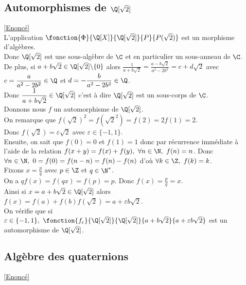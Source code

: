 \documentclass[8pt]{book}
\begin{document}
	\subsection{Automorphismes de $\Q[\sqrt 2]$ }
	\label{Automorphismes de Qsqrt2 corrigé}
	\textcolor{blue}{\hyperref[Automorphismes de Qsqrt2]{[Enoncé]}}\\
	L'application $\fonction{\Phi}{\Q[X]}{\Q[\sqrt2]}{P}{P(\sqrt 2)}$ est un morphisme d'algèbres.\\
	Donc $\Q[\sqrt 2]$ est une sous-algèbre de $\C$ et en particulier un sous-anneau de $\C$.\\
	De plus, si $a+b\sqrt 2\in \Q[\sqrt 2]\backslash\{0\}$ alors $\displaystyle\frac{1}{a+b\sqrt 2}=\frac{a-b\sqrt 2}{a^2-2b^2}=c+d\sqrt 2$ avec $c=\displaystyle\frac{a}{a^2-2b^2}\in \Q$ et $d=-\displaystyle\frac{b}{a^2-2b^2}\in \Q$.\\
	Donc $\displaystyle\frac{1}{a+b\sqrt 2}\in \Q[\sqrt 2]$ c'est à dire $\Q[\sqrt 2]$ est un sous-corps de $\C$.\\
	Donnons nous $f$ un automorphisme de $\Q[\sqrt 2]$.\\
	On remarque que $f(\sqrt 2)^2=f({\sqrt 2}^2)=f(2)=2f(1)=2$.\\
	Donc $f(\sqrt 2)=\varepsilon\sqrt 2$ avec $\varepsilon\in \{-1,1\}$.\\
	Ensuite, on sait que $f(0)=0$ et $f(1)=1$ donc par récurrence immédiate à l'aide de la relation $f(x+y)=f(x)+f(y),\ \forall n\in \N,\ f(n)=n$. Donc $\forall n\in \N,\ 0=f(0)=f(n-n)=f(n)-f(n)$ d'où $\forall k\in \Z,\ f(k)=k$.\\
	Fixons $x=\displaystyle\frac{p}{q}$ avec $p\in \Z$ et $q\in \N^*$.\\
	On a $qf(x)=f(qx)=f(p)=p$. Donc $f(x)=\displaystyle\frac{p}{q}=x$.\\
	Ainsi si $x=a+b\sqrt 2\in \Q[\sqrt 2]$ alors $f(x)=f(a)+f(b)f(\sqrt 2)=a+\varepsilon b\sqrt 2$.\\
	On vérifie que si $\varepsilon\in \{-1,1\},\ \fonction{f_\varepsilon}{\Q[\sqrt 2]}{\Q[\sqrt 2]}{a+b\sqrt 2}{a+\varepsilon b\sqrt 2}$ est un automorphisme de $\Q[\sqrt 2]$.
	
	\subsection{Algèbre des quaternions}
	\label{Algèbre des quaternions corrigé}
	\textcolor{blue}{\hyperref[Algèbre des quaternions]{[Enoncé]}}\\
	
\end{document}
